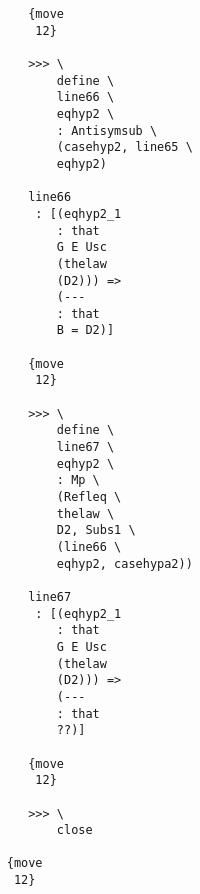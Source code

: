 \documentclass[12pt]{article}
\begin{document}
\begin{verbatim}
                                       {move 
                                        12}

                                       >>> \
                                           define \
                                           line66 \
                                           eqhyp2 \
                                           : Antisymsub \
                                           (casehyp2, line65 \
                                           eqhyp2)

                                       line66 
                                        : [(eqhyp2_1 
                                           : that 
                                           G E Usc 
                                           (thelaw 
                                           (D2))) => 
                                           (--- 
                                           : that 
                                           B = D2)]

                                       {move 
                                        12}

                                       >>> \
                                           define \
                                           line67 \
                                           eqhyp2 \
                                           : Mp \
                                           (Refleq \
                                           thelaw \
                                           D2, Subs1 \
                                           (line66 \
                                           eqhyp2, casehypa2))

                                       line67 
                                        : [(eqhyp2_1 
                                           : that 
                                           G E Usc 
                                           (thelaw 
                                           (D2))) => 
                                           (--- 
                                           : that 
                                           ??)]

                                       {move 
                                        12}

                                       >>> \
                                           close

                                    {move 
                                     12}


\end{verbatim}
\end{document}
